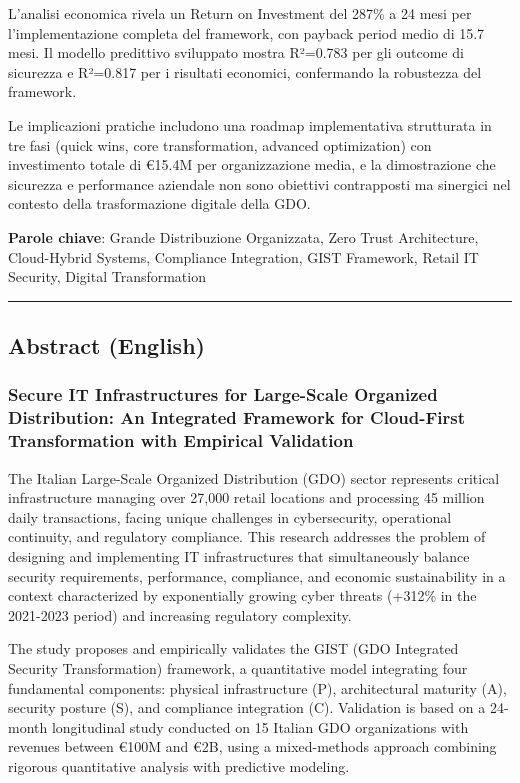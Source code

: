 \documentclass{report}
\begin{document}
L'analisi economica rivela un Return on Investment del 287\% a 24 mesi
per l'implementazione completa del framework, con payback period medio
di 15.7 mesi. Il modello predittivo sviluppato mostra R²=0.783 per gli
outcome di sicurezza e R²=0.817 per i risultati economici, confermando
la robustezza del framework.

Le implicazioni pratiche includono una roadmap implementativa
strutturata in tre fasi (quick wins, core transformation, advanced
optimization) con investimento totale di €15.4M per organizzazione
media, e la dimostrazione che sicurezza e performance aziendale non sono
obiettivi contrapposti ma sinergici nel contesto della trasformazione
digitale della GDO.

\textbf{Parole chiave}: Grande Distribuzione Organizzata, Zero Trust
Architecture, Cloud-Hybrid Systems, Compliance Integration, GIST
Framework, Retail IT Security, Digital Transformation

\begin{center}\rule{0.5\linewidth}{0.5pt}\end{center}

\subsection{Abstract (English)}\label{abstract-english}

\subsubsection{Secure IT Infrastructures for Large-Scale Organized
Distribution: An Integrated Framework for Cloud-First Transformation
with Empirical
Validation}\label{secure-it-infrastructures-for-large-scale-organized-distribution-an-integrated-framework-for-cloud-first-transformation-with-empirical-validation}

The Italian Large-Scale Organized Distribution (GDO) sector represents
critical infrastructure managing over 27,000 retail locations and
processing 45 million daily transactions, facing unique challenges in
cybersecurity, operational continuity, and regulatory compliance. This
research addresses the problem of designing and implementing IT
infrastructures that simultaneously balance security requirements,
performance, compliance, and economic sustainability in a context
characterized by exponentially growing cyber threats (+312\% in the
2021-2023 period) and increasing regulatory complexity.

The study proposes and empirically validates the GIST (GDO Integrated
Security Transformation) framework, a quantitative model integrating
four fundamental components: physical infrastructure (P), architectural
maturity (A), security posture (S), and compliance integration (C).
Validation is based on a 24-month longitudinal study conducted on 15
Italian GDO organizations with revenues between €100M and €2B, using a
mixed-methods approach combining rigorous quantitative analysis with
predictive modeling.
\end{document}
